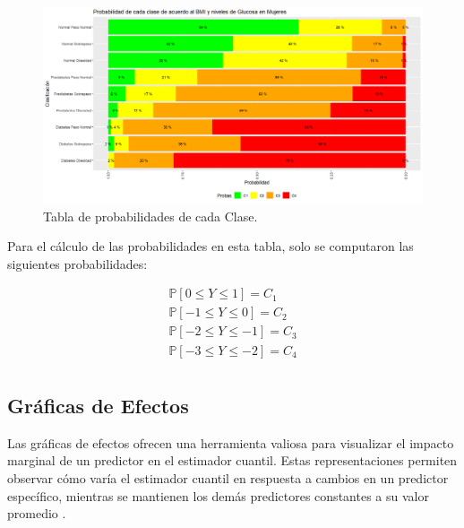 \begin{figure}[H]
    \centering
    \includegraphics[height = 10 cm, width = 0.9 \textwidth]{4img/tablaM.png}
    \caption{Tabla de probabilidades de cada Clase.}
    \label{fig:ejemploTabla}
\end{figure}

Para el cálculo de las probabilidades en esta tabla, solo se computaron las siguientes probabilidades:

\begin{equation}
     \begin{matrix}
\mathbb{P}[0 \leq Y \leq 1] = C_1 \\
\mathbb{P}[-1 \leq Y \leq 0] = C_2  \\
\mathbb{P}[-2 \leq Y \leq -1] = C_3 \\
\mathbb{P}[-3 \leq Y \leq -2] = C_4 \\
\end{matrix}
\end{equation}

\subsection{Gráficas de Efectos}

Las gráficas de efectos ofrecen una herramienta valiosa para visualizar el impacto marginal de un predictor en el estimador cuantil. Estas representaciones permiten observar cómo varía el estimador cuantil en respuesta a cambios en un predictor específico, mientras se mantienen los demás predictores constantes a su valor promedio \cite{Tepegjozova2022}.

